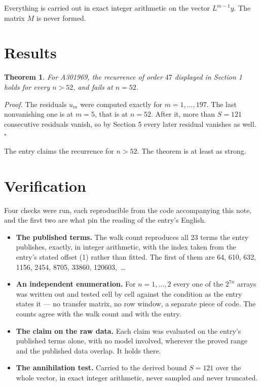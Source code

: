 \documentclass[11pt]{article}
\newtheorem{theorem}{Theorem}
\theoremstyle{definition}
\begin{document}
Everything is carried out in exact integer arithmetic on the vector $L^{m-1}y$. The matrix $M$ is never formed.

\section{Results}

\begin{theorem} For A301969, the recurrence of order $47$ displayed in Section 1 holds for every $n > 52$, and fails at $n = 52$.\end{theorem}

{\itshape Proof.} The residuals $u_m$ were computed exactly for $m = 1,\dots,197$. The last nonvanishing one is at $m = 5$, that is at $n = 52$. After it, more than $S = 121$ consecutive residuals vanish, so by Section 5 every later residual vanishes as well. $\square$

The entry claims the recurrence for $n > 52$. The theorem is at least as strong.

\section{Verification}

Four checks were run, each reproducible from the code accompanying this note, and the first two are what pin the reading of the entry's English.

\begin{itemize}

\item {\bfseries The published terms.} The walk count reproduces all 23 terms the entry publishes, exactly, in integer arithmetic, with the index taken from the entry's stated offset (1) rather than fitted. The first of them are 64, 610, 632, 1156, 2454, 8705, 33860, 120603,~\dots

\item {\bfseries An independent enumeration.} For $n = 1,\dots,2$ every one of the $2^{7n}$ arrays was written out and tested cell by cell against the condition as the entry states it --- no transfer matrix, no row window, a separate piece of code. The counts agree with the walk count and with the entry.

\item {\bfseries The claim on the raw data.} Each claim was evaluated on the entry's published terms alone, with no model involved, wherever the proved range and the published data overlap. It holds there.

\item {\bfseries The annihilation test.} Carried to the derived bound $S = 121$ over the whole vector, in exact integer arithmetic, never sampled and never truncated.

\end{itemize}
\end{document}
